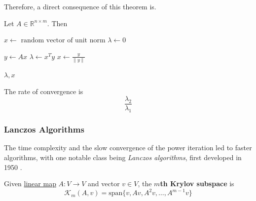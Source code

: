   Therefore, a direct consequence of this theorem is. 

  \begin{algo}
    Let $A \in \mathbb{R}^{n \times m}$. Then 
    \begin{algorithm}[H]
      \caption{Power Iteration Method}
      \label{alg:power_iteration}
      \begin{algorithmic}[1]
            
        
        \State $x \gets \text{ random vector of unit norm}$
        \State $\lambda \gets 0$
        
          \State $y \gets Ax$
          \State $\lambda \gets x^T y$
          \State $x \gets \frac{y}{\|y\|}$
        \EndFor
        
        \State \Return $\lambda, x$
        \EndProcedure
      \end{algorithmic}
    \end{algorithm}
  \end{algo} 

  \begin{corollary}
    \label{thm:rate-of-convergence-of-power-iteration}
    The rate of convergence is 
    \begin{equation}
      \frac{\lambda_2}{\lambda_1}
    \end{equation}
  \end{corollary}

\subsubsection{Lanczos Algorithms} 

  The time complexity and the slow convergence of the power iteration led to faster algorithms, with one notable class being \textit{Lanczos algorithms}, first developed in 1950 \cite{1950lanczos}. 

  \begin{definition}
    \label{def:krylov-subspace}
    Given \hyperref[lin-def:linear_map]{linear map} $A: V \to V$ and vector $v \in V$, the \textbf{$m$th Krylov subspace} is 
    \begin{equation}
      \mathcal{K}_m (A, v) = \mathrm{span} \{v, Av, A^2 v, \ldots, A^{m-1} v \}
    \end{equation}
  \end{definition}


